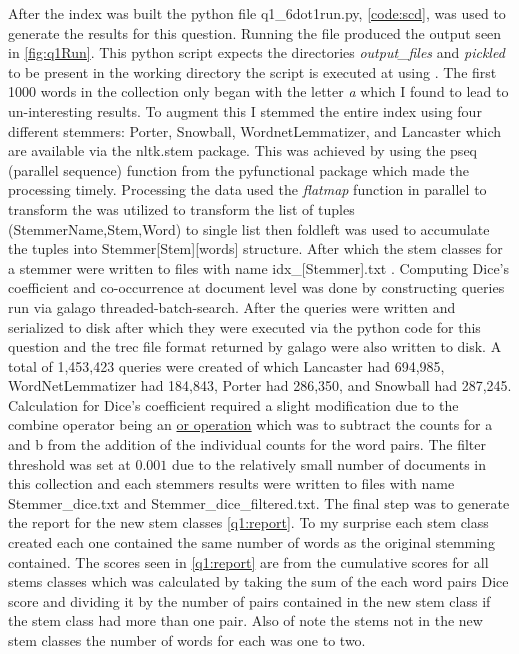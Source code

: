 \documentclass[11pt]{article}
\begin{document}
\noindent After the index was built the python file q1\_6dot1run.py, \autoref{code:scd}, was used to generate the results for this question. Running the file produced the output seen in \autoref{fig:q1Run}. This python script expects the directories \textit{output\_files} and \textit{pickled} to be present in the working directory the script is executed at using . The first 1000 words in the collection only began with the letter \textit{a} which I found to lead to un-interesting results. To augment this I stemmed the entire index using four different stemmers: Porter, Snowball, WordnetLemmatizer, and Lancaster which are available via the nltk.stem package. This was achieved by using the pseq (parallel sequence)  function from the pyfunctional package which made the processing timely. Processing the data used the \textit{flatmap} function in parallel to transform the was utilized to transform the list of tuples (StemmerName,Stem,Word) to single list then foldleft was used to accumulate the tuples into Stemmer[Stem][words] structure. After which the stem classes for a stemmer were written to files with name idx\_[Stemmer].txt .  \newline \newline \noindent
Computing Dice's coefficient and co-occurrence at document level was done by constructing queries run via galago threaded-batch-search. After the queries were written and serialized to disk after which they were executed via the python code for this question and the trec file format returned by galago were also written to disk. A total of 1,453,423 queries were created of which Lancaster had 694,985, WordNetLemmatizer had 184,843, Porter had 286,350, and  Snowball had 287,245. Calculation for Dice's coefficient required a slight modification due to the combine operator being an \href{https://sourceforge.net/p/lemur/wiki/Belief Operations/}{or operation} which was to subtract the counts for a and b from the addition of the individual counts for the word pairs. The filter threshold was set at $0.001$ due to the relatively small number of documents in this collection and each stemmers results were written to files with name Stemmer\_dice.txt and Stemmer\_dice\_filtered.txt. The final step was to generate the report for the new stem classes \autoref{q1:report}.
\newline \newline \noindent To my surprise each stem class created each one contained the same number of words as the original stemming contained. The scores seen in \autoref{q1:report} are from the cumulative scores for all stems classes which was calculated by taking the sum of the each word pairs Dice score and dividing it by the number of pairs contained in the new stem class if the stem class had more than one pair. Also of note the stems not in the new stem classes the number of words for each was one to two.
\end{document}
